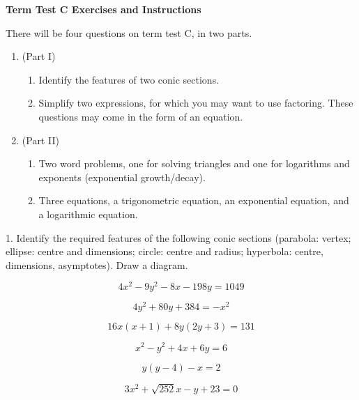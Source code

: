 \documentclass[11pt]{article}
\begin{document}
\textbf{Term Test C Exercises and Instructions}

There will be four questions on term test C, in two parts.

\begin{enumerate}
\item (Part I)
  \begin{enumerate}
  \item Identify the features of two conic sections.
  \item Simplify two expressions, for which you may want to use
    factoring. These questions may come in the form of an equation.
  \end{enumerate}
\item (Part II)
  \begin{enumerate}
  \item Two word problems, one for solving triangles and one for
    logarithms and exponents (exponential growth/decay).
  \item Three equations, a trigonometric equation, an exponential
    equation, and a logarithmic equation.
  \end{enumerate}
\end{enumerate}

1. Identify the required features of the following conic sections
(parabola: vertex; ellipse: centre and dimensions; circle: centre and
radius; hyperbola: centre, dimensions, asymptotes). Draw a diagram.

\begin{equation}
  \label{eq:ohdiedoe}
4x^{2}-9y^{2}-8x-198y=1049
\end{equation}

\begin{equation}
  \label{eq:mahbeizo}
4y^{2}+80y+384=-x^{2}
\end{equation}

\begin{equation}
  \label{eq:ohwoojie}
16x(x+1)+8y(2y+3)=131
\end{equation}

\begin{equation}
  \label{eq:chohtohk}
x^{2}-y^{2}+4x+6y=6
\end{equation}

\begin{equation}
  \label{eq:gofushoo}
y(y-4)-x=2
\end{equation}

\begin{equation}
  \label{eq:vibeibie}
3x^{2}+\sqrt{252}x-y+23=0
\end{equation}
\end{document}
